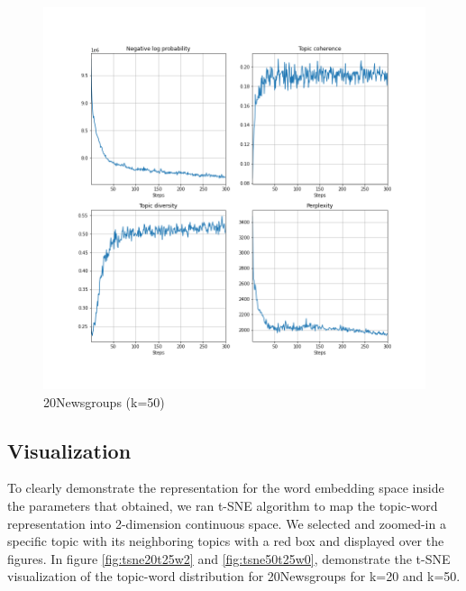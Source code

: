 \begin{figure}
\centering
\includegraphics[width=0.8\linewidth]{figures/0106/ppl_50t.png}
\caption{20Newsgroups (k=50)}
\label{fig:ppl50t}
\end{figure}
\subsection{Visualization}
To clearly demonstrate the representation for the word embedding space inside the parameters that obtained, we ran t-SNE algorithm to map the topic-word representation into 2-dimension continuous space. We selected and zoomed-in a specific topic with its neighboring topics with a red box and displayed over the figures. In figure \ref{fig:tsne20t25w2} and \ref{fig:tsne50t25w0}, demonstrate the t-SNE visualization of the topic-word distribution for 20Newsgroups for k=20 and k=50. 

